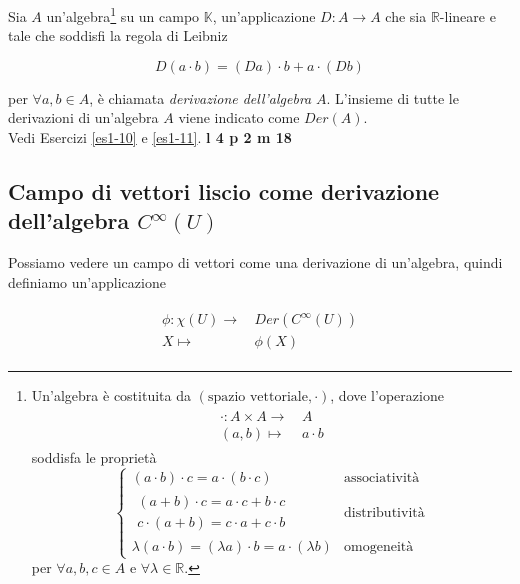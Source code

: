 Sia $ A $ un'algebra\footnote{%
	Un'algebra è costituita da $ (\text{spazio vettoriale},\cdot) $, dove l'operazione
		\begin{align}
			\begin{split}
				\cdot : A \times A \to& \, A\\
				(a,b) \mapsto& \, a \cdot b
			\end{split}
		\end{align}
	soddisfa le proprietà
	\begin{equation}
		\begin{cases}
			(a \cdot b) \cdot c = a \cdot (b \cdot c) & \text{associatività}\\
			\begin{split}
				(a + b) \cdot c = a \cdot c + b \cdot c\\
				c \cdot (a + b) = c \cdot a + c \cdot b
			\end{split} & \text{distributività}\\
			\lambda (a \cdot b) = (\lambda a) \cdot b = a \cdot (\lambda b) & \text{omogeneità}
		\end{cases}
	\end{equation}
	per $ \forall a,b,c \in A $ e $ \forall \lambda \in \mathbb{R} $.%
} su un campo $ \mathbb{K} $, un'applicazione $ D : A \to A $ che sia $ \mathbb{R} $-lineare e tale che soddisfi la regola di Leibniz

\begin{equation}
	D (a \cdot b) = (D a) \cdot b + a \cdot (D b)
\end{equation}

per $ \forall a,b \in A $, è chiamata \textit{derivazione dell'algebra} $ A $. L'insieme di tutte le derivazioni di un'algebra $ A $ viene indicato come $ Der(A) $.\\
Vedi Esercizi \ref{es1-10} e \ref{es1-11}. \textbf{l 4 p 2 m 18}

\subsection{Campo di vettori liscio come derivazione dell'algebra $ C^{\infty}(U) $}

Possiamo vedere un campo di vettori come una derivazione di un'algebra, quindi definiamo un'applicazione

\begin{align}
	\begin{split}
		\phi : \chi(U) \to& \, Der(C^{\infty}(U))\\
		X \mapsto& \, \phi(X)
	\end{split}
\end{align}

